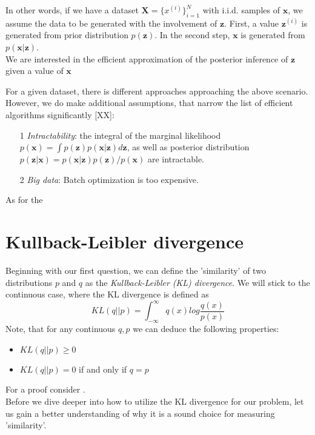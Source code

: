 In other words, if we have a dataset $\mathbf{X} = \{ x^{(i)}\}_{i=1}^N$ with i.i.d. samples of $\mathbf{x}$, we assume the data to be generated with the involvement of $\mathbf{z}$. First, a value $\mathbf{z}^{(i)}$ is generated from prior distribution $p(\mathbf{z})$. In the second step, $\mathbf{x}$ is generated from $p(\mathbf{x}|\mathbf{z})$. \\
We are interested in the efficient approximation of the posterior inference of $\mathbf{z}$ given a value of $\mathbf{x}$

For a given dataset, there is different approaches approaching the above scenario. However, we do make additional assumptions, that narrow the list of efficient algorithms significantly [XX]:

\begin{itemize}
	\item[1] \emph{Intractability}: the integral of the marginal likelihood $p(\mathbf{x}) = \int p(\mathbf{z}) p(\mathbf{x}|\mathbf{z}) d \mathbf{z}$, as well as posterior distribution $p(\mathbf{z}|\mathbf{x}) = p(\mathbf{x}|\mathbf{z}) p(\mathbf{z}) / p(\mathbf{x})$ are intractable.
	\item[2] \emph{Big data}: Batch optimization is too expensive.
\end{itemize}
As for the 

\section{Kullback-Leibler divergence}
Beginning with our first question, we can define the 'similarity' of two distributions $p$ and $q$ as the \emph{Kullback-Leibler (KL) divergence}. 
We will stick to the continuous case, where the KL divergence is defined as
\begin{equation}
	KL(q||p) = \int_{-\infty}^{\infty} q(x) log \frac{q(x)}{p(x)}
\end{equation}
Note, that for any continuous $q, p$ we can deduce the following properties:
\begin{itemize}
	\item $KL(q||p) \geq 0$
	\item $KL(q||p) = 0$ if and only if $q = p$
\end{itemize}
For a proof consider .\\ %

Before we dive deeper into how to utilize the KL divergence for our problem, let us gain a better understanding of why it is a sound choice for measuring 'similarity'. %

